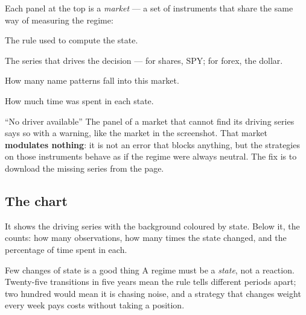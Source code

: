 Each panel at the top is a \emph{market} --- a set of instruments that share
the same way of measuring the regime:

\begin{description}[leftmargin = 1.4em, style = nextline, itemsep = 4pt]
  \item[\voce{RULE}] The rule used to compute the state.
  \item[\voce{DRIVER}] The series that drives the decision --- for shares,
    SPY; for forex, the dollar.
  \item[\voce{SYMBOLS}] How many name patterns fall into this market.
  \item[The coloured bar] How much time was spent in each state.
\end{description}

\begin{attenzione}{\enquote{No driver available}}
The panel of a market that cannot find its driving series says so with a
warning, like the  market in the screenshot. That market
\textbf{modulates nothing}: it is not an error that blocks anything, but the
strategies on those instruments behave as if the regime were always neutral.
The fix is to download the missing series from the  page.
\end{attenzione}

\subsection{The chart}

It shows the driving series with the background coloured by state. Below it,
the counts: how many observations, how many times the state changed, and the
percentage of time spent in each.

\begin{nota}{Few changes of state is a good thing}
A regime must be a \emph{state}, not a reaction. Twenty-five transitions in
five years mean the rule tells different periods apart; two hundred would
mean it is chasing noise, and a strategy that changes weight every week pays
costs without taking a position.
\end{nota}
